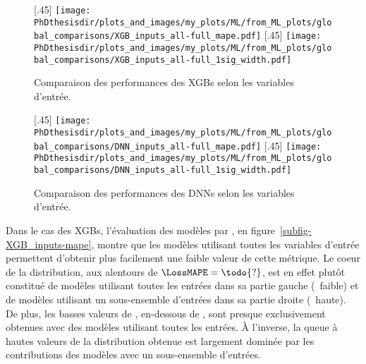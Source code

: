 \begin{figure}[h]
\centering

\subcaptionbox{\label{subfig-XGB_inputs-mape}}[.45\textwidth]
{\texttt{[image: \\PhDthesisdir/plots\_and\_images/my\_plots/ML/from\_ML\_plots/global\_comparisons/XGB\_inputs\_all-full\_mape.pdf]}\vspace{-\baselineskip}}
\hfill
\subcaptionbox{\label{subfig-XGB_inputs-1sigw}}[.45\textwidth]
{\texttt{[image: \\PhDthesisdir/plots\_and\_images/my\_plots/ML/from\_ML\_plots/global\_comparisons/XGB\_inputs\_all-full\_1sig\_width.pdf]}\vspace{-\baselineskip}}

\caption{Comparaison des performances des XGBs selon les variables d'entrée.}
\label{fig-XGB_inputs}
\end{figure}
\begin{figure}[h]
\centering

\subcaptionbox{\label{subfig-DNN_inputs-mape}}[.45\textwidth]
{\texttt{[image: \\PhDthesisdir/plots\_and\_images/my\_plots/ML/from\_ML\_plots/global\_comparisons/DNN\_inputs\_all-full\_mape.pdf]}\vspace{-\baselineskip}}
\hfill
\subcaptionbox{\label{subfig-DNN_inputs-1sigw}}[.45\textwidth]
{\texttt{[image: \\PhDthesisdir/plots\_and\_images/my\_plots/ML/from\_ML\_plots/global\_comparisons/DNN\_inputs\_all-full\_1sig\_width.pdf]}\vspace{-\baselineskip}}

\caption{Comparaison des performances des DNNs selon les variables d'entrée.}
\label{fig-DNN_inputs}
\end{figure}
\par
Dans le cas des XGBs,
l'évaluation des modèles par \LossMAPE, en figure~\ref{subfig-XGB_inputs-mape},
montre que les modèles utilisant toutes les variables d'entrée permettent d'obtenir plus facilement
une faible valeur de cette métrique.
Le coeur de la distribution,
aux alentours de $\LossMAPE=\todo{?}$,
est en effet plutôt constitué
de modèles utilisant
toutes les entrées
dans sa partie gauche (\LossMAPE\ faible)
et
de modèles utilisant
un sous-ensemble d'entrées
dans sa partie droite (\LossMAPE\ haute).
De plus, les basses valeurs de \LossMAPE, en-dessous de ,
sont presque exclusivement obtenues avec des modèles utilisant toutes les entrées.
À l'inverse, la queue à hautes valeurs de la distribution obtenue est largement dominée par les contributions des modèles avec un sous-ensemble d'entrées.
\par
